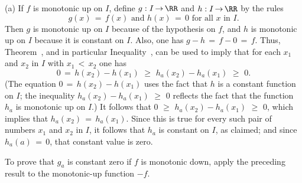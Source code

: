         (a) If $f$ is monotonic up on $I$, define $g:I \,{\rightarrow}\, {\RR}$ and $h:I \,{\rightarrow}\, {\RR}$ by the rules
        \begin{displaymath}
        g(x) \,=\, f(x) \mbox{ and } h(x) \,=\, 0 \mbox{ for all $x$ in $I$}.
        \end{displaymath}
    Then $g$ is monotonic up on $I$ because of the hypothesis on $f$, and $h$ is monotonic up on $I$ because it is constant on $I$.
    Also, one has $g-h \,=\, f-0 \,=\, f$. Thus, Theorem~, and in particular Inequality~,
    can be used to imply that for each $x_{1}$ and $x_{2}$ in $I$ with $x_{1}\,<\,x_{2}$ one has
        \begin{displaymath}
        0 \,=\, h(x_{2})-h(x_{1})\,\,{\geq}\,\,h_{a}(x_{2})-h_{a}(x_{1})\,\,{\geq}\,\,0.
        \end{displaymath}
    (The equation $0 \,=\, h(x_{2})-h(x_{1})$ uses the fact that $h$ is a constant function on $I$;
    the inequality $h_{a}(x_{2})-h_{a}(x_{1})\,\,{\geq}\,\,0$ reflects the fact that the function $h_{a}$ is monotonic up on $I$.)
    It follows that $0\,\,{\geq}\,\,h_{a}(x_{2})-h_{a}(x_{1})\,\,{\geq}\,\,0$, which implies that $h_{a}(x_{2}) \,=\, h_{a}(x_{1})$.
    Since this is true for every such pair of numbers $x_{1}$ and $x_{2}$ in $I$, it follows that $h_{a}$ is constant on $I$, as claimed; and since $h_{a}(a) \,=\, 0$, that constant value is zero.

        To prove that $g_{a}$ is constant zero if $f$ is monotonic down, apply the preceding result to the monotonic-up function $-f $.

\V

